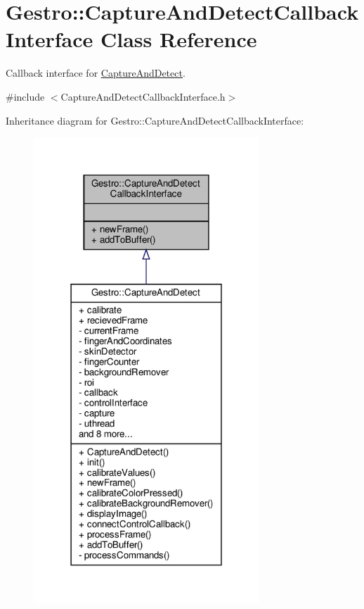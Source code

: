 \hypertarget{class_gestro_1_1_capture_and_detect_callback_interface}{}\section{Gestro\+:\+:Capture\+And\+Detect\+Callback\+Interface Class Reference}
\label{class_gestro_1_1_capture_and_detect_callback_interface}


Callback interface for \hyperlink{class_gestro_1_1_capture_and_detect}{Capture\+And\+Detect}.  




{\ttfamily \#include $<$Capture\+And\+Detect\+Callback\+Interface.\+h$>$}



Inheritance diagram for Gestro\+:\+:Capture\+And\+Detect\+Callback\+Interface\+:
\nopagebreak
\begin{figure}[H]
\begin{center}
\leavevmode
\includegraphics[width=240pt]{class_gestro_1_1_capture_and_detect_callback_interface__inherit__graph}
\end{center}
\end{figure}



